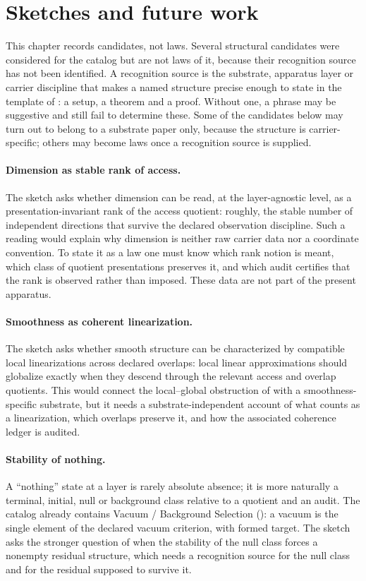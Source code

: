 \section{Sketches and future work}\label{sec:sketches}

This chapter records candidates, not laws.  Several structural
candidates were considered for the catalog but are not laws of it,
because their recognition source has not been identified.  A
recognition source is the substrate, apparatus layer or carrier
discipline that makes a named structure precise enough to state in the
template of : a setup, a theorem and a proof.
Without one, a phrase may be suggestive and still fail to determine
these.  Some of the candidates below may turn out to belong to a
substrate paper only, because the structure is carrier-specific; others
may become laws once a recognition source is supplied.

\paragraph{Dimension as stable rank of access.}  The sketch asks
whether dimension can be read, at the layer-agnostic level, as a
presentation-invariant rank of the access quotient: roughly, the stable
number of independent directions that survive the declared observation
discipline.  Such a reading would explain why dimension is neither raw
carrier data nor a coordinate convention.  To state it as a law one
must know which rank notion is meant, which class of quotient
presentations preserves it, and which audit certifies that the rank is
observed rather than imposed.  These data are not part of the present
apparatus.

\paragraph{Smoothness as coherent linearization.}  The sketch asks
whether smooth structure can be characterized by compatible local
linearizations across declared overlaps: local linear approximations
should globalize exactly when they descend through the relevant access
and overlap quotients.  This would connect the local--global
obstruction of  with a
smoothness-specific substrate, but it needs a substrate-independent
account of what counts as a linearization, which overlaps preserve it,
and how the associated coherence ledger is audited.

\paragraph{Stability of nothing.}  A ``nothing'' state at a layer is
rarely absolute absence; it is more naturally a terminal, initial, null
or background class relative to a quotient and an audit.  The catalog
already contains Vacuum / Background Selection (): a
vacuum is the single element of the declared vacuum criterion, with
formed target.  The sketch asks the stronger question of when the
stability of the null class forces a nonempty residual structure, which
needs a recognition source for the null class and for the residual
supposed to survive it.

